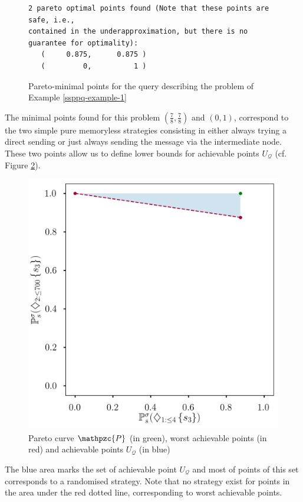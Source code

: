 \begin{example}
\begin{figure}
{\begin{verbatim}
2 pareto optimal points found (Note that these points are safe, i.e.,
contained in the underapproximation, but there is no guarantee for optimality):
   (     0.875,      0.875 )
   (         0,          1 )
  \end{verbatim}
  }
    \vspace{-2em}
    \captionsetup{justification=centering}
    \caption{Pareto-minimal points for the query describing the problem of Example \ref{ssppq-example-1}}
    \label{ssppq-program3}
  \end{figure}
  The minimal points found for this problem  $(\frac{7}{8}, \frac{7}{8})$ and $(0, 1)$, correspond to the two simple pure memoryless strategies consisting in either always trying a direct sending or just always sending the message via the intermediate node.
  These two points allow us to define lower bounds for achievable points $U_\mathcal{Q}$ (cf. Figure \ref{pareto-2D}).
  \begin{figure}[h!]
    \centering
    \includegraphics[width=0.7\linewidth]{resources/pareto-2D}
  \captionsetup{justification=centering}
  \caption{Pareto curve $\mathpzc{P}$ (in green),
    worst achievable points (in red) and achievable points $U_\mathcal{Q}$ (in blue)}
  \label{pareto-2D}
  \end{figure}
The blue area marks the set of achievable point $U_\mathcal{Q}$ and most of points of this set corresponds to a randomised strategy.
Note that no strategy exist for points in the area under the red dotted line, corresponding to worst achievable points.
\end{example}
